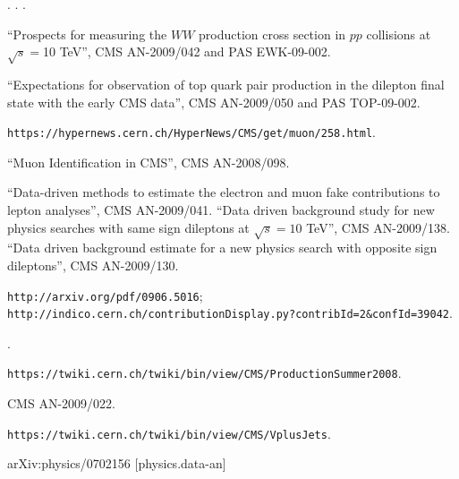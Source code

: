 \begin{thebibliography}{99}

.
.
.

 {``Prospects for measuring the $WW$ production cross section in $pp$ collisions at $\sqrt s = $10 TeV''}, CMS AN-2009/042 and PAS EWK-09-002.

 {``Expectations for observation of top quark pair production in the dilepton final state with the early CMS data''}, CMS AN-2009/050 and PAS TOP-09-002.

 {\tt https://hypernews.cern.ch/HyperNews/CMS/get/muon/258.html}.

 {``Muon Identification in CMS''}, CMS AN-2008/098.

 {``Data-driven methods to estimate the electron and muon fake contributions to lepton analyses''}, CMS AN-2009/041.
 {``Data driven background study for new physics searches with same sign dileptons at $\sqrt{s} = 10 $ TeV''}, CMS AN-2009/138.
 {``Data driven background estimate for a new physics search with opposite sign dileptons''}, CMS AN-2009/130.

 {\tt http://arxiv.org/pdf/0906.5016}; \\
{\tt http://indico.cern.ch/contributionDisplay.py?contribId=2\&confId=39042}.

.

 {\tt https://twiki.cern.ch/twiki/bin/view/CMS/ProductionSummer2008}.

 CMS AN-2009/022.

 {\tt https://twiki.cern.ch/twiki/bin/view/CMS/VplusJets}.

 arXiv:physics/0702156 [physics.data-an]


\end{thebibliography}








